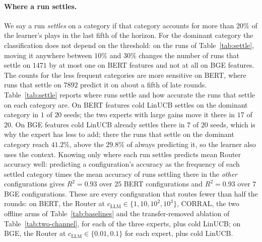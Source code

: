 \documentclass[anon]{alt2027} %
\begin{document}
\paragraph{Where a run settles.}
We say a run \emph{settles} on a category if that category accounts for more
than $20\%$ of the learner's plays in the last fifth of the horizon. For the
dominant category the classification does not depend on the threshold: on the
runs of Table~\ref{tab:settle}, moving it anywhere between $10\%$ and $30\%$
changes the number of runs that settle on $1471$ by at most one on BERT
features and not at all on BGE features. The counts for the less frequent
categories are more sensitive on BERT, where runs that settle on $7892$
predict it on about a fifth of late rounds. Table~\ref{tab:settle}
reports where runs settle and how accurate the runs that settle on each
category are. On BERT features cold LinUCB settles on the dominant category
in $1$ of $20$ seeds; the two experts with large gains move it there in $17$ of
$20$. On BGE features cold LinUCB already settles there in $7$ of $20$ seeds,
which is why the expert has less to add; there the runs that settle on the
dominant category reach $41.2\%$, above the $29.8\%$ of always predicting
it, so the learner also uses the context. Knowing only where each run
settles predicts mean Router accuracy well: predicting a configuration's
accuracy as the frequency of each settled category times the mean accuracy
of runs settling there in the \emph{other} configurations gives $R^2=0.93$
over $25$ BERT configurations and $R^2=0.93$ over $7$ BGE configurations.
These are every configuration that routes fewer than half the rounds: on
BERT, the Router at $c_{\mathrm{LLM}}\in\{1,10,10^2,10^3\}$, CORRAL, the two offline arms of
Table~\ref{tab:baselines} and the transfer-removed ablation of
Table~\ref{tab:two-channel}, for each of the three experts, plus cold
LinUCB; on BGE, the Router at $c_{\mathrm{LLM}}\in\{0.01,0.1\}$ for each expert, plus cold
LinUCB.
\end{document}
